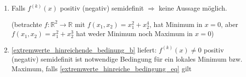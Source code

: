 \begin{remark}\vspace*{0pt}
	\begin{enumerate}[label={\arabic*)}]
		\item Falls $f^{(k)}(x)$ positiv (negativ) semidefinit $\Rightarrow$ keine Aussage möglich.
		
		(betrachte $f:\mathbb{R}^2\to\mathbb{R}$ mit $f(x_1, x_2) = x_1^2 + x_2^4$, hat Minimum in $x=0$, aber $f(x_1, x_2) = x_1^2 + x_2^3$ hat weder Minimum noch Maximum in $x=0$)
		
		\item \ref{extremwerte_hinreichende_bedinung_b} liefert: $f^{(k)}(x) \neq 0$ positiv (negativ) semidefinit ist notwendige Bedingung für ein lokales Minimum bzw. Maximum, falls \eqref{extremwerte_hinreiche_bedingung_eq} gilt
	\end{enumerate}
\end{remark}

